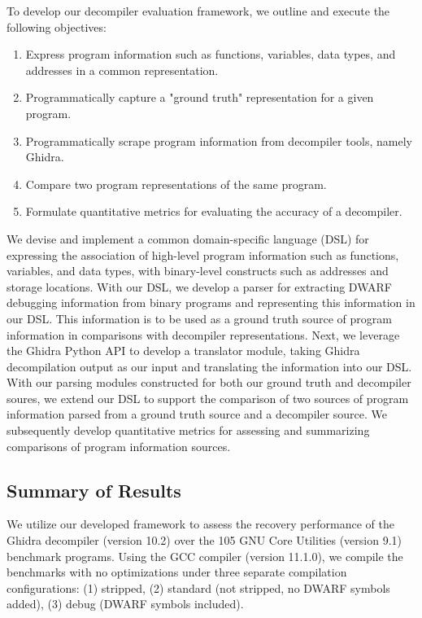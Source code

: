 \documentclass[conference]{IEEEtran}
\begin{document}
To develop our decompiler evaluation framework, we outline and execute the following objectives:

\begin{enumerate}
    \item Express program information such as functions, variables, data types, and addresses in a common representation.
    \item Programmatically capture a "ground truth" representation for a given program.
    \item Programmatically scrape program information from decompiler tools, namely Ghidra.
    \item Compare two program representations of the same program.
    \item Formulate quantitative metrics for evaluating the accuracy of a decompiler.
\end{enumerate}

We devise and implement a common domain-specific language (DSL) for expressing the association of high-level program information such as functions, variables, and data types, with binary-level constructs such as addresses and storage locations. With our DSL, we develop a parser for extracting DWARF debugging information from binary programs and representing this information in our DSL. This information is to be used as a ground truth source of program information in comparisons with decompiler representations. Next, we leverage the Ghidra Python API to develop a translator module, taking Ghidra decompilation output as our input and translating the information into our DSL. With our parsing modules constructed for both our ground truth and decompiler soures, we extend our DSL to support the comparison of two sources of program information parsed from a ground truth source and a decompiler source. We subsequently develop quantitative metrics for assessing and summarizing comparisons of program information sources.

\subsection{Summary of Results}

We utilize our developed framework to assess the recovery performance of the Ghidra decompiler (version 10.2) over the 105 GNU Core Utilities (version 9.1) benchmark programs. Using the GCC compiler (version 11.1.0), we compile the benchmarks with no optimizations under three separate compilation configurations: (1) stripped, (2) standard (not stripped, no DWARF symbols added), (3) debug (DWARF symbols included).
\end{document}
